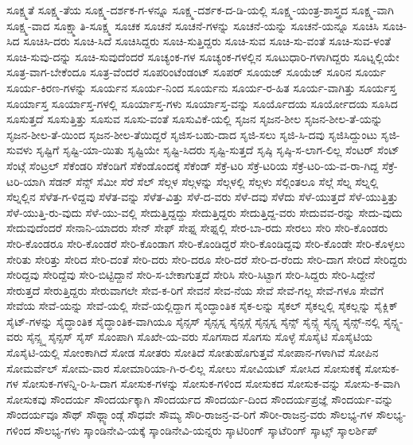 {ಸೂಕ್ಷ್ಮತೆ
ಸೂಕ್ಷ್ಮ-ತೆಯ
ಸೂಕ್ಷ್ಮ-ದರ್ಶಕ-ಗ-ಳನ್ನೂ
ಸೂಕ್ಷ್ಮ-ದರ್ಶಕ-ದ-ಡಿ-ಯಲ್ಲಿ
ಸೂಕ್ಷ್ಮ-ಯಂತ್ರ-ಶಾಸ್ತ್ರದ
ಸೂಕ್ಷ್ಮ-ವಾಗಿ
ಸೂಕ್ಷ್ಮ-ವಾದ
ಸೂಕ್ಷ್ಮಾತಿ-ಸೂಕ್ಷ್ಮ
ಸೂಚಕ
ಸೂಚನೆ
ಸೂಚನೆ-ಗಳನ್ನು
ಸೂಚನೆ-ಯನ್ನು
ಸೂಚನೆ-ಯನ್ನೂ
ಸೂಚಿಸಿ
ಸೂಚಿ-ಸಿದ
ಸೂಚಿಸಿ-ದರು
ಸೂಚಿ-ಸಿದೆ
ಸೂಚಿಸಿದ್ದರು
ಸೂಚಿ-ಸುತ್ತಿದ್ದರು
ಸೂಚಿ-ಸುವ
ಸೂಚಿ-ಸು-ವಂತೆ
ಸೂಚಿ-ಸುವ-ಳಂತೆ
ಸೂಚಿ-ಸುವು-ದನ್ನು
ಸೂಚಿ-ಸುವುದೆಂದರೆ
ಸೂಚ್ಯಂಕ-ಗಳ
ಸೂಚ್ಯಂಕ-ಗಳಲ್ಲಿನ
ಸೂಟುಧಾರಿ-ಗಳಾಗಿದ್ದರು
ಸೂಟ್ನಲ್ಲಿಯೇ
ಸೂತ್ರ-ವಾಗ-ಬೇಕೆಂದೂ
ಸೂತ್ರ-ವೆಂದರೆ
ಸೂಪರಿಂಟೆಂಡಂಟ್
ಸೂಪರ್
ಸೂಯಜ್
ಸೂಯೆಜ್
ಸೂರಿನ
ಸೂರ್ಯ
ಸೂರ್ಯ-ಕಿರಣ-ಗಳನ್ನು
ಸೂರ್ಯನ
ಸೂರ್ಯ-ನಿಂದ
ಸೂರ್ಯನು
ಸೂರ್ಯ-ರ-ಹಿತ
ಸೂರ್ಯ-ವಾಗಿತ್ತು
ಸೂರ್ಯಸ್ತ
ಸೂರ್ಯಾಸ್ತ
ಸೂರ್ಯಾಸ್ತ-ಗಳಲ್ಲಿ
ಸೂರ್ಯಾಸ್ತ-ಗಳು
ಸೂರ್ಯಾಸ್ತ-ವನ್ನು
ಸೂರ್ಯೊದಯ
ಸೂರ್ಯೋದಯ
ಸೂಸಿದ
ಸೂಸುತ್ತದೆ
ಸೂಸುತ್ತಿತ್ತು
ಸೂಸುವ
ಸೂಸು-ವಂತೆ
ಸೂಸುವಿಕೆ-ಯಲ್ಲಿ
ಸೃಜನ
ಸೃಜನ-ಶೀಲ
ಸೃಜನ-ಶೀಲ-ತೆ-ಯನ್ನು
ಸೃಜನ-ಶೀಲ-ತೆ-ಯಿಂದ
ಸೃಜನ-ಶೀಲ-ತೆಯಿದ್ದರೆ
ಸೃಜಿಸ-ಬಹು-ದಾದ
ಸೃಜಿ-ಸಲು
ಸೃಜಿ-ಸಿ-ದವು
ಸೃಜಿಸಿದ್ದುಂಟು
ಸೃಜಿ-ಸುವಳು
ಸೃಷ್ಟಿಗೆ
ಸೃಷ್ಟಿ-ಯಾ-ಯಿತು
ಸೃಷ್ಟಿಯೇ
ಸೃಷ್ಟಿ-ಸಿದರು
ಸೃಷ್ಟಿ-ಸುತ್ತದೆ
ಸೃಷ್ಠಿ
ಸೃಷ್ಠಿ-ಸ-ಲಾಗ-ಲಿಲ್ಲ
ಸೆಂಟರ್
ಸೆಂಟ್
ಸೆಂಟ್ಗೆ
ಸೆಂಟ್ರಲ್
ಸೆಕೆಂಡರಿ
ಸೆಕೆಂಡಿಗೆ
ಸೆಕೆಂಡೊಂದಕ್ಕೆ
ಸೆಕೆಂಡ್
ಸೆಕ್ರೆ-ಟರಿ
ಸೆಕ್ರೆ-ಟರಿಯ
ಸೆಕ್ರೆ-ಟರಿ-ಯ-ವ-ರಾ-ಗಿದ್ದ
ಸೆಕ್ರೆ-ಟರಿ-ಯಾಗಿ
ಸೆಡನ್
ಸೆನ್ಸ್
ಸೆಮೀ
ಸೆರೆ
ಸೆಲ್
ಸೆಲ್ಗಳ
ಸೆಲ್ಗಳನ್ನು
ಸೆಲ್ಗಳಲ್ಲಿ
ಸೆಲ್ಗಳು
ಸೆಲ್ಗಿಂತಲೂ
ಸೆಲ್ಗೆ
ಸೆಲ್ನ
ಸೆಲ್ನಲ್ಲಿ
ಸೆಲ್ನಲ್ಲಿನ
ಸೆಳೆತ-ಗ-ಳಿದ್ದವು
ಸೆಳೆತ-ವನ್ನು
ಸೆಳೆತ-ವಿತ್ತು
ಸೆಳೆ-ದ-ವರು
ಸೆಳೆ-ದವು
ಸೆಳೆದು
ಸೆಳೆ-ಯುತ್ತದೆ
ಸೆಳೆ-ಯುತ್ತಿತ್ತು
ಸೆಳೆ-ಯುತ್ತಿ-ರು-ವುದು
ಸೆಳೆ-ಯು-ವಲ್ಲಿ
ಸೇದುತ್ತಿದ್ದದ್ದು
ಸೇದುತ್ತಿದ್ದರು
ಸೇದುತ್ತಿದ್ದ-ವರು
ಸೇದುವವ-ರನ್ನು
ಸೇದು-ವುದು
ಸೇದುವುದೆಂದರೆ
ಸೇನಾನಿ-ಯಾದರು
ಸೇನ್
ಸೇಫ್
ಸೇಫ್ನ
ಸೇಫ್ನಲ್ಲಿ
ಸೇರ-ಬಾ-ರದು
ಸೇರಲು
ಸೇರಿ
ಸೇರಿ-ಕೊಂಡರು
ಸೇರಿ-ಕೊಂಡರೂ
ಸೇರಿ-ಕೊಂಡರೆ
ಸೇರಿ-ಕೊಂಡಾಗ
ಸೇರಿ-ಕೊಂಡಿದ್ದರೆ
ಸೇರಿ-ಕೊಂಡಿದ್ದವು
ಸೇರಿ-ಕೊಂಡೇ
ಸೇರಿ-ಕೊಳ್ಳಲು
ಸೇರಿತು
ಸೇರಿತ್ತು
ಸೇರಿದ
ಸೇರಿ-ದಂತೆ
ಸೇರಿ-ದರು
ಸೇರಿ-ದರೂ
ಸೇರಿ-ದರೆ
ಸೇರಿ-ದ-ರೆಂದು
ಸೇರಿ-ದಾಗ
ಸೇರಿದೆ
ಸೇರಿದ್ದರು
ಸೇರಿದ್ದವು
ಸೇರಿದ್ದೆವು
ಸೇರಿ-ಬಿಟ್ಟಿದ್ದಾನೆ
ಸೇರಿ-ಸ-ಬೇಕಾಗುತ್ತದೆ
ಸೇರಿಸಿ
ಸೇರಿ-ಸಿಟ್ಟಾಗ
ಸೇರಿ-ಸಿದ್ದರು
ಸೇರಿ-ಸಿದ್ದೇನೆ
ಸೇರುತ್ತದೆ
ಸೇರುತ್ತಿದ್ದರು
ಸೇರುವಾಗಲೇ
ಸೇವ-ಕ-ರಿಗೆ
ಸೇವನೆ
ಸೇವ-ನೆಯ
ಸೇವೆ
ಸೇವೆ-ಗಲ್ಲ
ಸೇವೆ-ಗಳೂ
ಸೇವೆಗೆ
ಸೇವೆಯ
ಸೇವೆ-ಯನ್ನು
ಸೇವೆ-ಯಲ್ಲಿ
ಸೇವೆ-ಯಲ್ಲಿದ್ದಾಗ
ಸೈಂದ್ಧಾಂತಿಕ
ಸೈಕ-ಲನ್ನು
ಸೈಕಲ್
ಸೈಕಲ್ನಲ್ಲಿ
ಸೈಕಲ್ಲನ್ನು
ಸೈಕ್ಲಿಕ್
ಸೈಟ್-ಗಳನ್ನು
ಸೈದ್ಧಾಂತಿಕ
ಸೈದ್ಧಾಂತಿಕ-ವಾಗಿಯೂ
ಸೈನ್ಸಸ್
ಸೈನ್ಸಸ್ನ
ಸೈನ್ಸಸ್ಗೆ
ಸೈನ್ಸಸ್ನ
ಸೈನ್ಸ್
ಸೈನ್ಸ್ಗೆ
ಸೈನ್ಸ್ನ
ಸೈನ್ಸ್-ನಲ್ಲಿ
ಸೈನ್ಸ್ನ-ವರು
ಸೈನ್ಸ್ಸ್ನ
ಸೈನ್ಸಸ್
ಸೈಸ್
ಸೊಂಪಾಗಿ
ಸೊಖೇ-ಯ-ವರು
ಸೊಗಸಾದ
ಸೊಗಸು
ಸೊಳ್ಳೆ
ಸೊಸೈಟಿ
ಸೊಸೈಟಿಯ
ಸೊಸೈಟಿ-ಯಲ್ಲಿ
ಸೋಂಕಾಗಿದೆ
ಸೋಡ
ಸೋತರು
ಸೋತಿದೆ
ಸೋತುಹೊಗುತ್ತವೆ
ಸೋಪಾನ-ಗಳಾಗಿವೆ
ಸೋಪಿನ
ಸೋಮರ್ವೆಲ್
ಸೋಮ-ವಾರ
ಸೋಮಾರಿಯಾ-ಗಿ-ರ-ಲಿಲ್ಲ
ಸೋಲು
ಸೋವಿಯಟ್
ಸೋಸಿದ
ಸೋಸುಕಕ್ಕೆ
ಸೋಸುಕ-ಗಳ
ಸೋಸುಕ-ಗಳನ್ನಿ-ರಿ-ಸಿ-ದಾಗ
ಸೋಸುಕ-ಗಳನ್ನು
ಸೋಸುಕ-ಗಳಿಂದ
ಸೋಸುಕದ
ಸೋಸುಕ-ವನ್ನು
ಸೋಸು-ಕ-ವಾಗಿ
ಸೋಸುಕವು
ಸೌಂದರ್ಯ
ಸೌಂದರ್ಯಕ್ಕಾಗಿ
ಸೌಂದರ್ಯದ
ಸೌಂದರ್ಯ-ದಿಂದ
ಸೌಂದರ್ಯಪ್ರಜ್ಞೆ
ಸೌಂದರ್ಯ-ವನ್ನು
ಸೌಂದರ್ಯವೂ
ಸೌಥ್
ಸೌಥ್ಲ್ಯಾಂಡ್ಗೆ
ಸೌಧವೇ
ಸೌಮ್ಯ
ಸೌರಿ-ರಾಜನ್ರ-ವ-ರಿಗೆ
ಸೌರೀ-ರಾಜನ್ರ-ವರು
ಸೌಲಭ್ಯ-ಗಳ
ಸೌಲಭ್ಯ-ಗಳಿಂದ
ಸೌಲಭ್ಯ-ಗಳು
ಸ್ಕಾಂಡಿನೇವಿ-ಯಕ್ಕೆ
ಸ್ಕಾಂಡಿನೇವಿ-ಯನ್ನರು
ಸ್ಕಾಟಿರಿಂಗ್
ಸ್ಕಾಟೆರಿಂಗ್
ಸ್ಕಾಟ್ಸ್
ಸ್ಕಾಲರ್ಶಿಪ್
}
